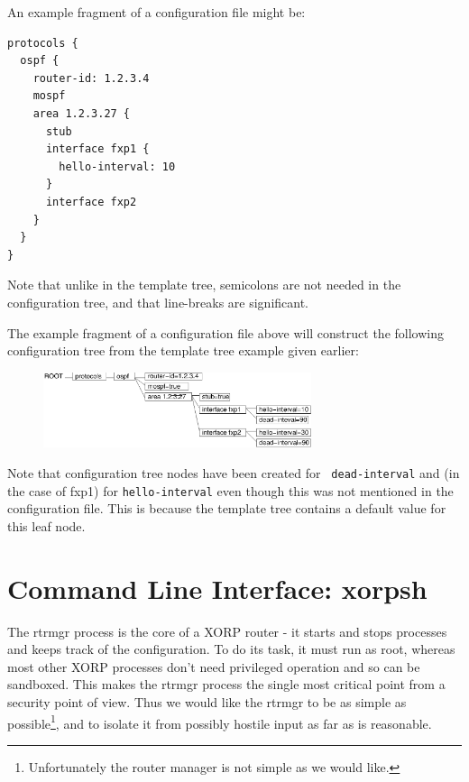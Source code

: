 \documentclass[11pt]{article}
\begin{document}
An example fragment of a configuration file might be:
\begin{verbatim}
protocols {
  ospf {
    router-id: 1.2.3.4
    mospf
    area 1.2.3.27 {
      stub
      interface fxp1 {
        hello-interval: 10
      }
      interface fxp2
    }
  }
}
\end{verbatim}
Note that unlike in the template tree, semicolons are not needed in the
configuration tree, and that line-breaks are significant.

The example fragment of a configuration file above will construct the
following configuration tree from the template tree example given
earlier:
\begin{figure}[htb]
\centerline{\includegraphics[width=0.7\textwidth]{figs/config}}
\vspace{.05in}
\end{figure}

Note that configuration tree nodes have been created for {\tt
dead-interval} and (in the case of fxp1) for {\tt hello-interval} even
though this was not mentioned in the configuration file.  This is
because the template tree contains a default value for this leaf node.
\newpage
\section{Command Line Interface: xorpsh}
The rtrmgr process is the core of a XORP router - it starts and stops
processes and keeps track of the configuration.  To do its task, it
must run as root, whereas most other XORP processes don't need
privileged operation and so can be sandboxed.  This makes the rtrmgr
process the single most critical point from a security point of view.
Thus we would like the rtrmgr to be as simple as
possible\footnote{Unfortunately the router manager is not simple as we
would like.}, and to isolate it from possibly hostile input as far as
is reasonable.
\end{document}
